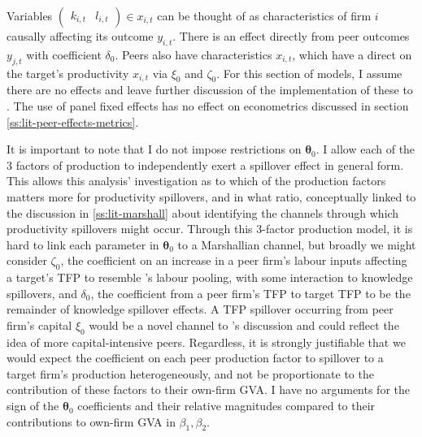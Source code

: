 Variables
$\begin{pmatrix}
    k_{i,t} &   l_{i,t}
\end{pmatrix}\in x_{i,t}$
can be thought of as  characteristics of firm ${i}$ causally affecting its outcome $y_{i,t}$.
There is an  effect directly from peer outcomes $y_{j,t}$ with coefficient $\delta_0$.
Peers also have  characteristics $x_{i,t}$,
which have a direct  on the target's productivity $x_{i,t}$ via $\xi_0$ and $\zeta_0$.
For this section of models, I assume there are no  effects
and leave further discussion of the implementation of these to .
The use of panel fixed effects has no effect on econometrics
discussed in section \ref{ss:lit-peer-effects-metrics}.
\par
It is important to note that I do not impose restrictions on $\boldsymbol\theta_0$.
I allow each of the 3 factors of production to independently exert a spillover effect in general form.
This allows this analysis' investigation as to which of the production factors matters more for productivity spillovers,
and in what ratio, conceptually linked to the discussion in \ref{ss:lit-marshall}
about identifying the channels through which productivity spillovers might occur.
Through this 3-factor production model, it is hard to link each parameter in $\boldsymbol\theta_0$
to a Marshallian channel, but broadly we might consider $\zeta_0$,
the coefficient on an increase in a peer firm's labour inputs affecting a target's TFP to resemble \cite{Marshall1920}'s
labour pooling, with some interaction to knowledge spillovers,
and $\delta_0$, the coefficient from a peer firm's TFP to target TFP to be the remainder of knowledge spillover effects.
A TFP spillover occurring from peer firm's capital $\xi_0$ would be a novel channel to \cite{Marshall1920}'s discussion
and could reflect the idea of more capital-intensive peers.
Regardless, it is strongly justifiable that we would expect the coefficient on each peer production factor
to spillover to a target firm's production heterogeneously,
and not be proportionate to the contribution of these factors to their own-firm GVA.
I have no  arguments for the sign of the $\boldsymbol\theta_0$ coefficients
and their relative magnitudes compared to their contributions to own-firm GVA in $\beta_1, \beta_2$.

